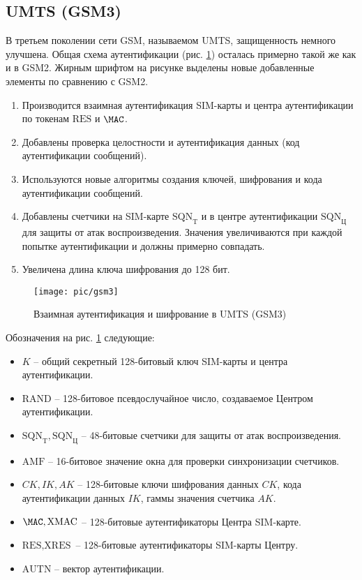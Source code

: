 \subsection{UMTS (GSM3)}

В третьем поколении сети GSM, называемом UMTS, защищенность немного улучшена. Общая схема аутентификации (рис. \ref{fig:gsm3}) осталась примерно такой же как и в GSM2. Жирным шрифтом на рисунке выделены новые добавленные элементы по сравнению с GSM2.
\begin{enumerate}
    \item Производится взаимная аутентификация SIM-карты и центра аутентификации по токенам $\textrm{RES}$ и $\MAC$.
    \item Добавлены проверка целостности и аутентификация данных (код аутентификации сообщений).
    \item Используются новые алгоритмы создания ключей, шифрования и кода аутентификации сообщений.
    \item Добавлены счетчики на SIM-карте $\textrm{SQN}_\textrm{T}$ и в центре аутентификации $\textrm{SQN}_\textrm{Ц}$ для защиты от атак воспроизведения. Значения увеличиваются при каждой попытке аутентификации и должны примерно совпадать.
    \item Увеличена длина ключа шифрования до 128 бит.
\end{enumerate}

\begin{figure}[h!]
	\centering
	\texttt{[image: pic/gsm3]}
	\caption{Взаимная аутентификация и шифрование в UMTS (GSM3)\label{fig:gsm3}}
\end{figure}

Обозначения на рис. \ref{fig:gsm3} следующие:
\begin{itemize}
    \item $K$ -- общий секретный 128-битовый ключ SIM-карты и центра аутентификации.
    \item $\textrm{RAND}$ -- 128-битовое псевдослучайное число, создаваемое Центром аутентификации.
    \item $\textrm{SQN}_\textrm{T}, \textrm{SQN}_\textrm{Ц}$ -- 48-битовые счетчики для защиты от атак воспроизведения.
    \item $\textrm{AMF}$ -- 16-битовое значение окна для проверки синхронизации счетчиков.
    \item $CK, IK, AK$ -- 128-битовые ключи шифрования данных $CK$, кода аутентификации данных $IK$, гаммы значения счетчика $AK$.
    \item $\MAC, \textrm{XMAC}$ -- 128-битовые аутентификаторы Центра SIM-карте.
    \item $\textrm{RES}, \textrm{XRES}$ -- 128-битовые аутентификаторы SIM-карты Центру.
    \item $\textrm{AUTN}$ -- вектор аутентификации.
\end{itemize}

